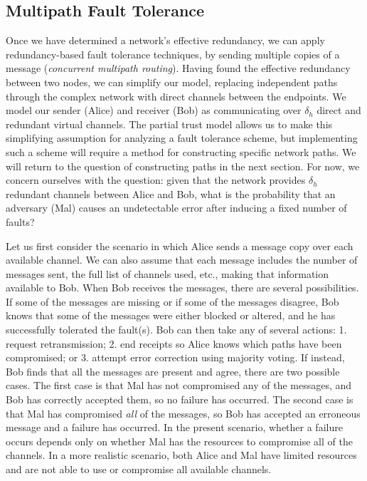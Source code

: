 \documentclass[twocolumn]{article}
\begin{document}
\subsection{Multipath Fault Tolerance}

Once we have determined a network's effective redundancy,
we can apply redundancy-based fault tolerance techniques,
by sending multiple copies of a message
({\em concurrent multipath routing}).
Having found the effective redundancy between two nodes,
we can simplify our model, replacing independent paths through the
complex network with direct channels between the endpoints.
We model our sender (Alice) and receiver (Bob) as
communicating over $\delta_h$ direct and redundant virtual channels.
The partial trust model allows us to make this simplifying assumption
for analyzing a fault tolerance scheme,
but implementing such a scheme will require a method for constructing
specific network paths.
We will return to the question of constructing paths in the next section.
For now, we concern ourselves with the question:
given that the network provides $\delta_h$ redundant channels between
Alice and Bob,
what is the probability that an adversary (Mal) causes an undetectable
error after inducing a fixed number of faults?

Let us first consider the scenario in which
Alice sends a message copy over each available channel.
We can also assume that each message includes the number of messages sent,
the full list of channels used, etc.,
making that information available to Bob.
When Bob receives the messages, there are several possibilities.
If some of the messages are missing
or if some of the messages disagree,
Bob knows that some of the messages were either blocked or altered,
and he has successfully tolerated the fault(s).
Bob can then take any of several actions:
1. request retransmission;
2. end receipts so Alice knows which paths have been compromised;
or 3. attempt error correction using majority voting.
If instead, Bob finds that all the messages are present and agree,
there are two possible cases.
The first case is that Mal has not compromised any of the messages,
and Bob has correctly accepted them, so no failure has occurred.
The second case is that Mal has compromised {\em all} of the messages,
so Bob has accepted an erroneous message and a failure has occurred.
In the present scenario,
whether a failure occurs depends only on whether Mal has the resources to
compromise all of the channels.
In a more realistic scenario,
both Alice and Mal have limited resources and are not able to use or
compromise all available channels.
\end{document}

